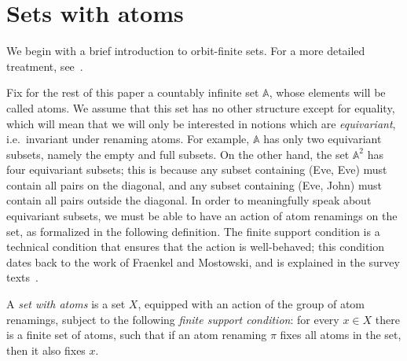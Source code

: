 \documentclass[10pt,a4paper]{amsart}
\numberwithin{equation}{section}
\theoremstyle{plain}
\newcommand{\atoms}{\mathbb A}
\begin{document}
\section{Sets with atoms}
We begin  with  a brief introduction to orbit-finite sets. For a more detailed treatment, see~\cite{bojanczyk_slightly2018}.

Fix for the rest of this paper a countably infinite set $\atoms$, whose elements will be called atoms.  We assume that this set has no other structure except for equality, which will mean that we will only be interested in notions which are \emph{equivariant}, i.e.~invariant under renaming atoms. For example, $\atoms$ has only two equivariant subsets, namely the empty and full subsets. On the other hand, the set $\atoms^2$ has four equivariant subsets; this is because any subset containing (Eve, Eve) must contain all pairs on the diagonal, and any subset containing (Eve, John) must contain all pairs outside the diagonal.  In order to meaningfully speak about equivariant subsets, we must be able to have an action of atom renamings on the set, as formalized in the following definition. The finite support condition is a technical condition that ensures that the action is well-behaved; this condition dates back to the work of Fraenkel and Mostowski, and is explained in the survey texts~\cite{PittsAM:nomsns,bojanczyk_slightly2018}.




\begin{definition}
    A \emph{set with atoms} is a set $X$, equipped with an action of the group of atom renamings, subject to the following \emph{finite support condition}: for every $x \in X$ there is a finite set of atoms, such that if an atom renaming $\pi$ fixes all atoms in the set, then it also fixes $x$.
\end{definition}
\end{document}
